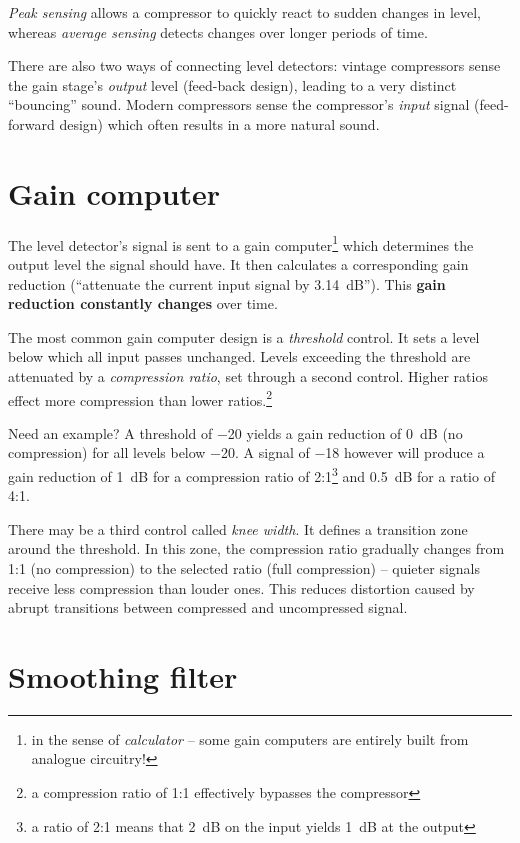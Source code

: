 \emph{Peak sensing} allows a compressor to quickly react to sudden
changes in level, whereas \emph{average sensing} detects changes over
longer periods of time.

There are also two ways of connecting level detectors: vintage
compressors sense the gain stage's \emph{output} level (feed-back
design), leading to a very distinct ``bouncing'' sound.  Modern
compressors sense the compressor's \emph{input} signal (feed-forward
design) which often results in a more natural sound.

\section{Gain computer}
\label{sec:gain_computer}

The level detector's signal is sent to a gain computer\footnote{in the
  sense of \emph{calculator} -- some gain computers are entirely built
  from analogue circuitry!} which determines the output level the
signal should have.  It then calculates a corresponding gain reduction
(``attenuate the current input signal by \SI{3.14}{\dB}'').  This
\textbf{gain reduction constantly changes} over time.

The most common gain computer design is a \emph{threshold} control.
It sets a level below which all input passes unchanged.  Levels
exceeding the threshold are attenuated by a \emph{compression ratio},
set through a second control.  Higher ratios effect more compression
than lower ratios.\footnote{a compression ratio of 1:1 effectively
  bypasses the compressor}

Need an example?  A threshold of \SI{-20}{\dBFS} yields a gain
reduction of \SI{0}{\dB} (no compression) for all levels below
\SI{-20}{\dBFS}.  A signal of \SI{-18}{\dBFS} however will produce a
gain reduction of \SI{1}{\dB} for a compression ratio of
2:1\footnote{a ratio of 2:1 means that \SI{2}{\dB} on the input yields
  \SI{1}{\dB} at the output} and \SI{0.5}{\dB} for a ratio of 4:1.

There may be a third control called \emph{knee width}. It defines a
transition zone around the threshold.  In this zone, the compression
ratio gradually changes from 1:1 (no compression) to the selected
ratio (full compression) -- quieter signals receive less compression
than louder ones.  This reduces distortion caused by abrupt
transitions between compressed and uncompressed signal.

\section{Smoothing filter}
\label{sec:smoothing_filter}

